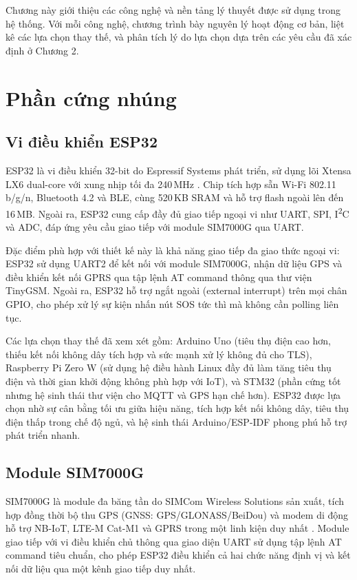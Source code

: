 \documentclass[../DoAn.tex]{subfiles}
\begin{document}
Chương này giới thiệu các công nghệ và nền tảng lý thuyết được sử dụng trong hệ thống. Với mỗi công nghệ, chương trình bày nguyên lý hoạt động cơ bản, liệt kê các lựa chọn thay thế, và phân tích lý do lựa chọn dựa trên các yêu cầu đã xác định ở Chương 2.

\section{Phần cứng nhúng}
\label{section:3.1}

\subsection{Vi điều khiển ESP32}
\label{subsection:3.1.1}

ESP32 là vi điều khiển 32-bit do Espressif Systems phát triển, sử dụng lõi Xtensa LX6 dual-core với xung nhịp tối đa 240\,MHz \cite{espressif_esp32}. Chip tích hợp sẵn Wi-Fi 802.11 b/g/n, Bluetooth 4.2 và BLE, cùng 520\,KB SRAM và hỗ trợ flash ngoài lên đến 16\,MB. Ngoài ra, ESP32 cung cấp đầy đủ giao tiếp ngoại vi như UART, SPI, I\textsuperscript{2}C và ADC, đáp ứng yêu cầu giao tiếp với module SIM7000G qua UART.

Đặc điểm phù hợp với thiết kế này là khả năng giao tiếp đa giao thức ngoại vi: ESP32 sử dụng UART2 để kết nối với module SIM7000G, nhận dữ liệu GPS và điều khiển kết nối GPRS qua tập lệnh AT command thông qua thư viện TinyGSM. Ngoài ra, ESP32 hỗ trợ ngắt ngoài (external interrupt) trên mọi chân GPIO, cho phép xử lý sự kiện nhấn nút SOS tức thì mà không cần polling liên tục.

Các lựa chọn thay thế đã xem xét gồm: Arduino Uno (tiêu thụ điện cao hơn, thiếu kết nối không dây tích hợp và sức mạnh xử lý không đủ cho TLS), Raspberry Pi Zero W (sử dụng hệ điều hành Linux đầy đủ làm tăng tiêu thụ điện và thời gian khởi động không phù hợp với IoT), và STM32 (phần cứng tốt nhưng hệ sinh thái thư viện cho MQTT và GPS hạn chế hơn). ESP32 được lựa chọn nhờ sự cân bằng tối ưu giữa hiệu năng, tích hợp kết nối không dây, tiêu thụ điện thấp trong chế độ ngủ, và hệ sinh thái Arduino/ESP-IDF phong phú hỗ trợ phát triển nhanh.

\subsection{Module SIM7000G}
\label{subsection:3.1.2}

SIM7000G là module đa băng tần do SIMCom Wireless Solutions sản xuất, tích hợp đồng thời bộ thu GPS (GNSS: GPS/GLONASS/BeiDou) và modem di động hỗ trợ NB-IoT, LTE-M Cat-M1 và GPRS trong một linh kiện duy nhất \cite{simcom_sim7000g}. Module giao tiếp với vi điều khiển chủ thông qua giao diện UART sử dụng tập lệnh AT command tiêu chuẩn, cho phép ESP32 điều khiển cả hai chức năng định vị và kết nối dữ liệu qua một kênh giao tiếp duy nhất.
\end{document}
